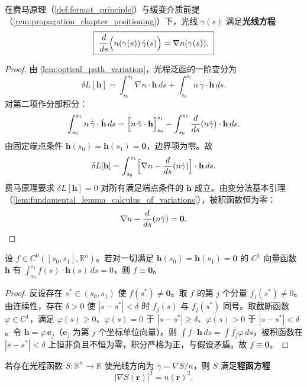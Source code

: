 \begin{theorem}[光线方程]\label{thm:ray_equation}
在费马原理（\cref{def:fermat_principle}）与缓变介质前提（\cref{rem:propagation_chapter_positioning}）下，光线 $\gamma(s)$ 满足\textbf{光线方程}
\[
\boxed{\ \frac{d}{ds}\Bigl(n(\gamma(s))\,\dot\gamma(s)\Bigr) = \nabla n(\gamma(s)).\ }
\]
\end{theorem}

\begin{proof}
由 \cref{lem:optical_path_variation}，光程泛函的一阶变分为
\[
\delta L[\mathbf{h}] = \int_{s_0}^{s_1}\nabla n\cdot\mathbf{h}\,ds + \int_{s_0}^{s_1}n\,\dot\gamma\cdot\dot{\mathbf{h}}\,ds.
\]
对第二项作分部积分：
\[
\int_{s_0}^{s_1}n\,\dot\gamma\cdot\dot{\mathbf{h}}\,ds = \Bigl[n\,\dot\gamma\cdot\mathbf{h}\Bigr]_{s_0}^{s_1} - \int_{s_0}^{s_1}\frac{d}{ds}(n\dot\gamma)\cdot\mathbf{h}\,ds.
\]
由固定端点条件 $\mathbf{h}(s_0)=\mathbf{h}(s_1)=\mathbf{0}$，边界项为零。故
\[
\delta L[\mathbf{h}] = \int_{s_0}^{s_1}\Bigl[\nabla n - \frac{d}{ds}(n\dot\gamma)\Bigr]\cdot\mathbf{h}\,ds.
\]
费马原理要求 $\delta L[\mathbf{h}]=0$ 对所有满足端点条件的 $\mathbf{h}$ 成立。由变分法基本引理（\cref{lem:fundamental_lemma_calculus_of_variations}），被积函数恒为零：
\[
\nabla n - \frac{d}{ds}(n\dot\gamma) = \mathbf{0}. \qedhere
\]
\end{proof}

\begin{lemma}[变分法基本引理]\label{lem:fundamental_lemma_calculus_of_variations}
设 $f\in C^0([s_0,s_1],\mathbb{R}^n)$。若对一切满足 $\mathbf{h}(s_0)=\mathbf{h}(s_1)=\mathbf{0}$ 的 $C^1$ 向量函数 $\mathbf{h}$ 有 $\int_{s_0}^{s_1}f(s)\cdot\mathbf{h}(s)\,ds = 0$，则 $f\equiv\mathbf{0}$。
\end{lemma}

\begin{proof}
反设存在 $s^*\in(s_0,s_1)$ 使 $f(s^*)\neq\mathbf{0}$。取 $f$ 的第 $j$ 个分量 $f_j(s^*)\neq 0$。由连续性，存在 $\delta>0$ 使 $|s-s^*|<\delta$ 时 $f_j(s)$ 与 $f_j(s^*)$ 同号。取截断函数 $\varphi\in C^1$，满足 $\varphi(s)\ge 0$、$\varphi(s)=0$ 于 $|s-s^*|\ge\delta$、$\varphi(s)>0$ 于 $|s-s^*|<\delta$。令 $\mathbf{h} = \varphi\,\mathbf{e}_j$（$\mathbf{e}_j$ 为第 $j$ 个坐标单位向量）。则 $\int f\cdot\mathbf{h}\,ds = \int f_j\varphi\,ds$，被积函数在 $|s-s^*|<\delta$ 上恒非负且不恒为零，积分严格为正，与假设矛盾。故 $f\equiv\mathbf{0}$。
\end{proof}

\begin{corollary}[程函方程]\label{cor:eikonal_equation}
若存在光程函数 $S:\mathbb{R}^n\to\mathbb{R}$ 使光线方向为 $\dot\gamma = \nabla S/n$，则 $S$ 满足\textbf{程函方程}
\[
\boxed{\ |\nabla S(\mathbf{r})|^2 = n(\mathbf{r})^2.\ }
\]
\end{corollary}

